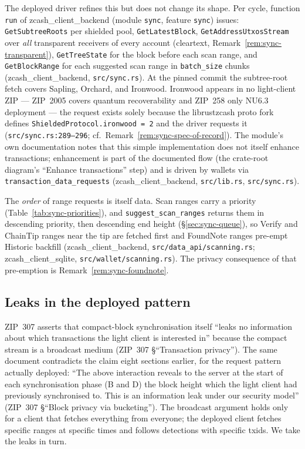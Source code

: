 \documentclass[11pt,a4paper]{article}
\theoremstyle{definition}
\begin{document}
The deployed driver refines this but does not change its shape. Per cycle,
function \texttt{run} of \textsf{zcash\_client\_backend} (module
\texttt{sync}, feature \texttt{sync}) issues: \texttt{GetSubtreeRoots} per
shielded pool, \texttt{GetLatestBlock}, \texttt{GetAddressUtxosStream} over
\emph{all} transparent receivers of every account (cleartext,
Remark~\ref{rem:sync-transparent}), \texttt{GetTreeState} for the block
before each scan range, and \texttt{GetBlockRange} for each suggested scan
range in \texttt{batch\_size} chunks (\textsf{zcash\_client\_backend},
\texttt{src/sync.rs}). At the pinned commit the subtree-root fetch covers
Sapling, Orchard, and Ironwood. Ironwood appears in no light-client ZIP
--- ZIP~2005 covers quantum recoverability and ZIP~258 only NU6.3
deployment --- the request exists solely because the
\textsf{librustzcash} proto fork defines
\texttt{ShieldedProtocol.ironwood = 2} and the driver requests it
(\texttt{src/sync.rs:289--296}; cf.\
Remark~\ref{rem:sync-spec-of-record}).
The module's own documentation notes that this simple implementation does
not itself enhance transactions; enhancement is part of the documented
flow (the crate-root diagram's ``Enhance transactions'' step) and is driven
by wallets via \texttt{transaction\_data\_requests}
(\textsf{zcash\_client\_backend}, \texttt{src/lib.rs}, \texttt{src/sync.rs}).

The \emph{order} of range requests is itself data. Scan ranges carry a
priority (Table~\ref{tab:sync-priorities}), and
\texttt{suggest\_scan\_ranges} returns them in descending priority, then
descending end height (\S\ref{sec:sync-queue}), so \textsf{Verify} and
\textsf{ChainTip} ranges near the tip are fetched first and
\textsf{FoundNote} ranges pre-empt \textsf{Historic} backfill
(\textsf{zcash\_client\_backend}, \texttt{src/data\_api/scanning.rs};
\textsf{zcash\_client\_sqlite}, \texttt{src/wallet/scanning.rs}). The
privacy consequence of that pre-emption is
Remark~\ref{rem:sync-foundnote}.

\subsection{Leaks in the deployed pattern}\label{sec:sync-privacy-leaks}

ZIP~307 asserts that compact-block synchronisation itself ``leaks no
information about which transactions the light client is interested in''
because the compact stream is a broadcast medium
(ZIP~307 \S``Transaction privacy''). The same document contradicts the
claim eight sections earlier, for the request pattern actually deployed:
``The above interaction reveals to the server at the start of each
synchronisation phase (B and D) the block height which the light client had
previously synchronised to. This is an information leak under our security
model'' (ZIP~307 \S``Block privacy via bucketing''). The broadcast argument
holds only for a client that fetches everything from everyone; the deployed
client fetches specific ranges at specific times and follows detections
with specific txids. We take the leaks in turn.
\end{document}
